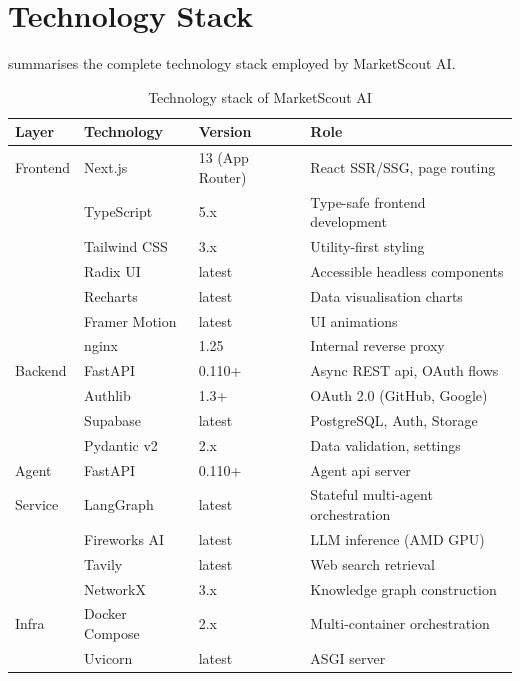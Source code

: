 \documentclass[12pt,a4paper,oneside]{book}
\begin{document}
\section{Technology Stack}

 summarises the complete technology stack employed by MarketScout AI.

\begin{table}[H]
\centering
\caption{Technology stack of MarketScout AI}
\label{tab:tech_stack}
\begin{tabularx}{\textwidth}{lllX}
\toprule
\textbf{Layer} & \textbf{Technology} & \textbf{Version} & \textbf{Role} \\
\midrule
Frontend & Next.js        & 13 (App Router) & React SSR/SSG, page routing \\
         & TypeScript     & 5.x             & Type-safe frontend development \\
         & Tailwind CSS   & 3.x             & Utility-first styling \\
         & Radix UI       & latest          & Accessible headless components \\
         & Recharts       & latest          & Data visualisation charts \\
         & Framer Motion  & latest          & UI animations \\
         & nginx          & 1.25            & Internal reverse proxy \\
\midrule
Backend  & FastAPI        & 0.110+          & Async REST \gls{api}, OAuth flows \\
         & Authlib        & 1.3+            & OAuth 2.0 (GitHub, Google) \\
         & Supabase       & latest          & PostgreSQL, Auth, Storage \cite{supabase2024} \\
         & Pydantic v2    & 2.x             & Data validation, settings \\
\midrule
Agent    & FastAPI        & 0.110+          & Agent \gls{api} server \\
Service  & LangGraph      & latest          & Stateful multi-agent orchestration \cite{langgraph2024} \\
         & Fireworks AI   & latest          & LLM inference (AMD GPU) \cite{fireworks2024} \\
         & Tavily         & latest          & Web search retrieval \cite{tavily2024} \\
         & NetworkX       & 3.x             & Knowledge graph construction \\
\midrule
Infra    & Docker Compose & 2.x             & Multi-container orchestration \\
         & Uvicorn        & latest          & ASGI server \\
\bottomrule
\end{tabularx}
\end{table}
\end{document}
